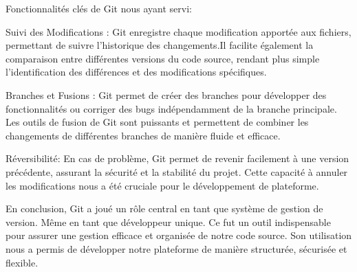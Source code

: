 Fonctionnalités clés de Git nous ayant servi: \\
\par 
Suivi des Modifications : Git enregistre chaque modification apportée aux fichiers, permettant de suivre l'historique des changements.Il facilite également la comparaison entre différentes versions du code source, rendant plus simple l'identification des différences et des modifications spécifiques.
\par 
Branches et Fusions : Git permet de créer des branches pour développer des fonctionnalités ou corriger des bugs indépendamment de la branche principale. 
Les outils de fusion de Git sont puissants et permettent de combiner les changements de différentes branches de manière fluide et efficace.
\par 
Réversibilité: En cas de problème, Git permet de revenir facilement à une version précédente, assurant la sécurité et la stabilité du projet.
Cette capacité à annuler les modifications nous a été cruciale pour le développement de plateforme.
\par 
En conclusion, Git a joué un rôle central en tant que système de gestion de version. Même en tant que développeur unique. Ce fut un outil indispensable pour assurer une gestion efficace et organisée de notre code source. Son utilisation nous a permis de développer notre plateforme de manière structurée, sécurisée et flexible.

